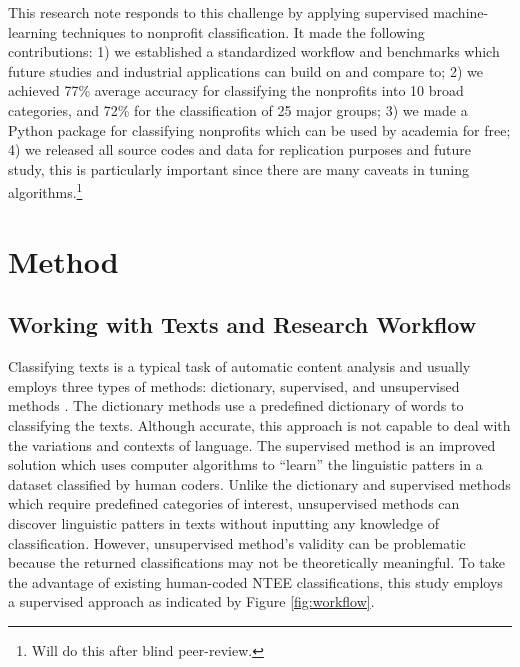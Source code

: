 \documentclass[11pt]{article}
\begin{document}
This research note responds to this challenge by applying supervised machine-learning techniques to nonprofit classification. It made the following contributions: 1) we established a standardized workflow and benchmarks which future studies and industrial applications can build on and compare to; 2) we achieved 77\% average accuracy for classifying the nonprofits into 10 broad categories, and 72\% for the classification of 25 major groups; 3) we made a Python package for classifying nonprofits which can be used by academia for free; 4) we released all source codes and data for replication purposes and future study, this is particularly important since there are many caveats in tuning algorithms.\footnote{Will do this after blind peer-review.} 



\section{Method}

\subsection{Working with Texts and Research Workflow}

Classifying texts is a typical task of automatic content analysis and usually employs three types of methods: dictionary, supervised, and unsupervised methods \parencite[268-269]{GrimmerTextDataPromise2013}. The dictionary methods use a predefined dictionary of words to classifying the texts. Although accurate, this approach is not capable to deal with the variations and contexts of language. The supervised method is an improved solution which uses computer algorithms to ``learn'' the linguistic patters in a dataset classified by human coders. Unlike the dictionary and supervised methods which require predefined categories of interest, unsupervised methods can discover linguistic patters in texts without inputting any knowledge of classification. However, unsupervised method's validity can be problematic because the returned classifications may not be theoretically meaningful. To take the advantage of existing human-coded NTEE classifications, this study employs a supervised approach as indicated by Figure \ref{fig:workflow}.
\end{document}
